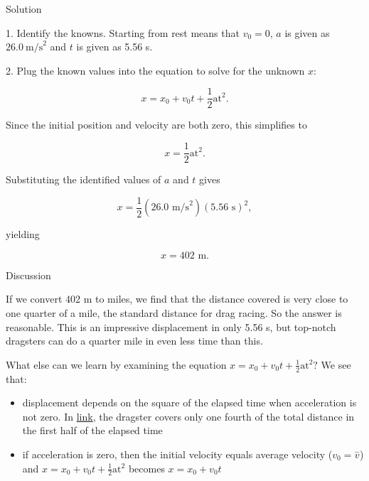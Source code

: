 \documentclass[
]{book}
\providecommand{\tightlist}{%
  \setlength{\itemsep}{0pt}\setlength{\parskip}{0pt}}
\newenvironment{tinysection}{}{}
\begin{document}
\begin{tinysection}

{Solution}

\end{tinysection}

1. Identify the knowns. \textbf{}Starting from
rest means that \({v_{0} = 0}{}\),
\emph{}\(a{}\)\emph{} is
given as \({\text{26}\text{.}0\ \text{m/s}^{2}}{}\) and
\(t{}\)\emph{} is given as 5.56 s.

2. Plug the known values into the equation to solve for the unknown
\(x{}\):

\leavevmode\hypertarget{import-auto-id2171407}{}%
\[{{x = {x_{0} + v_{0}}}{t + \frac{1}{2}}\text{at}^{2}\text{.}}{}\]

Since the initial position and velocity are both zero, this simplifies
to

\leavevmode\hypertarget{import-auto-id2171445}{}%
\[{{x = \frac{1}{2}}\text{at}^{2}\text{.}}{}\]

Substituting the identified values of \(a{}\) and \(t{}\) gives

\leavevmode\hypertarget{import-auto-id2169820}{}%
\[{{x = \frac{1}{2}}\left( {\text{26}\text{.}\text{0\ m/s}^{2}} \right)\left( {5\text{.}\text{56\ s}} \right)^{2},}{}\]

yielding

\leavevmode\hypertarget{import-auto-id2171362}{}%
\[{x = \text{402\ m.}}{}\]

\begin{tinysection}

{Discussion}

\end{tinysection}

If we convert 402 m to miles, we find that the distance covered is very
close to one quarter of a mile, the standard distance for drag racing.
So the answer is reasonable. This is an impressive displacement in only
5.56 s, but top-notch dragsters can do a quarter mile in even less time
than this.

What else can we learn by examining the equation
\({{x = {x_{0} + v_{0}}}{t + \frac{1}{2}}\text{at}^{2}}?\) We see that:

\begin{itemize}
\tightlist
\item
  \protect\hypertarget{import-auto-id2166810}{}{displacement depends on the square of the elapsed time when
  acceleration is not zero. In
  \protect\hyperlink{fs-id1164906457202}{link}, the dragster
  covers only one fourth of the total distance in the first half of
  the elapsed time}
\item
  \protect\hypertarget{import-auto-id2167534}{}{if acceleration is zero, then the initial velocity equals average
  velocity (\({v_{0} = \overset{-}{v}}{}\)) and
  \({{x = {x_{0} + v_{0}}}{t + \frac{1}{2}}\text{at}^{2}}{}\) becomes
  \({{x = {x_{0} + v_{0}}}t}{}\)}
\end{itemize}
\end{document}
